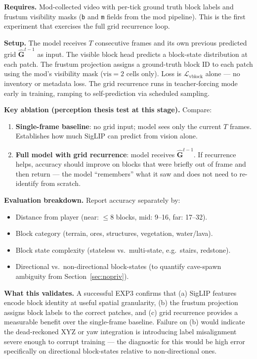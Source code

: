 \documentclass[11pt,a4paper]{article}
\begin{document}
\textbf{Requires.} Mod-collected video with per-tick ground truth block labels and frustum visibility masks (\texttt{b} and \texttt{m} fields from the mod pipeline). This is the first experiment that exercises the full grid recurrence loop.

\textbf{Setup.} The model receives $T$ consecutive frames and its own previous predicted grid $\hat{\mathbf{G}}^{t-1}$ as input. The visible block head predicts a block-state distribution at each patch. The frustum projection assigns a ground-truth block ID to each patch using the mod's visibility mask ($\text{vis}=2$ cells only). Loss is $\mathcal{L}_\text{vblock}$ alone --- no inventory or metadata loss. The grid recurrence runs in teacher-forcing mode early in training, ramping to self-prediction via scheduled sampling.

\textbf{Key ablation (perception thesis test at this stage).} Compare:
\begin{enumerate}
  \item \textbf{Single-frame baseline}: no grid input; model sees only the current $T$ frames. Establishes how much SigLIP can predict from vision alone.
  \item \textbf{Full model with grid recurrence}: model receives $\hat{\mathbf{G}}^{t-1}$. If recurrence helps, accuracy should improve on blocks that were briefly out of frame and then return --- the model ``remembers'' what it saw and does not need to re-identify from scratch.
\end{enumerate}

\textbf{Evaluation breakdown.} Report accuracy separately by:
\begin{itemize}
  \item Distance from player (near: $\leq$8 blocks, mid: 9--16, far: 17--32).
  \item Block category (terrain, ores, structures, vegetation, water/lava).
  \item Block state complexity (stateless vs.\ multi-state, e.g.\ stairs, redstone).
  \item Directional vs.\ non-directional block-states (to quantify cave-spawn ambiguity from Section~\ref{sec:nopriv}).
\end{itemize}

\textbf{What this validates.} A successful EXP3 confirms that (a) SigLIP features encode block identity at useful spatial granularity, (b) the frustum projection assigns block labels to the correct patches, and (c) grid recurrence provides a measurable benefit over the single-frame baseline. Failure on (b) would indicate the dead-reckoned XYZ or yaw integration is introducing label misalignment severe enough to corrupt training --- the diagnostic for this would be high error specifically on directional block-states relative to non-directional ones.
\end{document}

